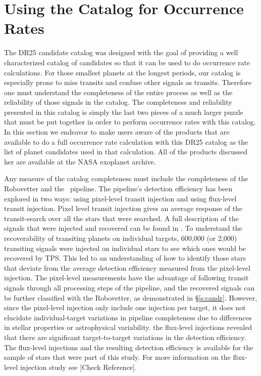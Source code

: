 \section{Using the Catalog for Occurrence Rates}

The DR25 candidate catalog was designed with the goal of providing a well characterized catalog of candidates so that it can be used to do occurrence rate calculations.  For those smallest planets at the longest periods, our catalog is especially prone to miss transits and confuse other signals as transits.  Therefore one must understand the completeness of the entire process as well as the reliability of those signals in the catalog.  The completeness and reliability presented in this catalog is simply the last two pieces of a much larger puzzle that must be put together in order to perform occurrence rates with this catalog.  In this section we endeavor to make users aware of the products that are available to do a full occurrence rate calculation with this DR25 catalog as the list of planet candidates used in that calculation. All of the products discussed her are available at the NASA exoplanet archive. 

Any measure of the catalog completeness must include the completeness of the Robovetter and the \Kepler\ pipeline.  The pipeline's detection efficiency has been explored in two ways: using pixel-level transit injection and using flux-level transit injection.  Pixel level transit injection gives an average response of the transit-search over all the stars that were searched. A full description of the signals that were injected and recovered can be found in \citet{Christiansen2017}.  To understand the recoverability of transiting planets on individual targets, 600,000 (or 2,000) transiting signals were injected on individual stars to see which ones would be recovered by TPS.  This led to an understanding of how to identify those stars that deviate from the average detection efficiency measured from the pixel-level injection.  The pixel-level measurements have the advantage of following transit signals through all processing steps of the \Kepler{} pipeline, and the recovered signals can be further classified with the Robovetter, as demonstrated in \S\ref{s:candr}.  However, since the pixel-level injection only include one injection per target, it does not elucidate individual-target variations in pipeline completeness due to differences in stellar properties or astrophysical variability. the flux-level injections revealed  that  there  are  significant target-to-target variations in the detection efficiency. The flux-level injections and the resulting detection efficiency is available for the sample of stars that were part of this study. For more information on the flux-level injection study see \citet{Burke2017c}[Check Reference]. 


